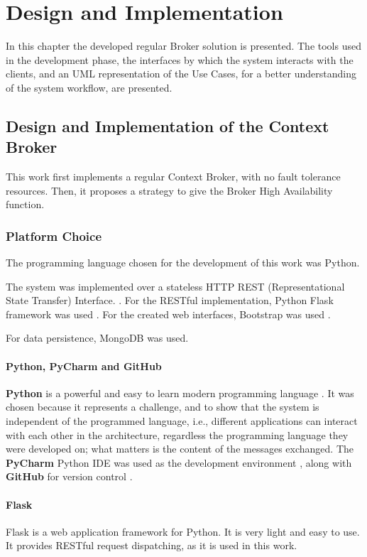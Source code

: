 \chapter{Design and Implementation}
\label{chap:implementation}
In this chapter the developed regular Broker solution is presented. The tools used in the development phase, the interfaces by which the system interacts with the clients, and an UML representation of the Use Cases, for a better understanding of the system workflow, are presented.

\section{Design and Implementation of the Context Broker}
\label{sec:broker}
This work first implements a regular Context Broker, with no fault tolerance resources. Then, it proposes a strategy to give the Broker High Availability function.
 
\subsection{Platform Choice}
The programming language chosen for the development of this work was Python. 

The system was implemented over a stateless HTTP REST (Representational State Transfer) Interface. \cite{jakl2005representational}. For the RESTful implementation, Python Flask framework was used \cite{flask}. For the created web interfaces, Bootstrap was used  \cite{bootstrap} .

For data persistence, MongoDB was used.

\subsubsection{Python, PyCharm and GitHub}
\textbf{Python} is a powerful and easy to learn modern programming language \cite{python}. It was chosen because it represents a challenge, and to show that the system is independent of the programmed language, i.e., different applications can interact with each other in the architecture, regardless the programming language they were developed on; what matters is the content of the messages exchanged. The \textbf{PyCharm} Python IDE was used as the development environment \cite{pycharm}, along with \textbf{GitHub} for version control \cite{github}.

\subsubsection{Flask}
Flask is a web application framework for Python. It is very light and easy to use. It provides RESTful request dispatching, as it is used in this work. \cite{flask}

